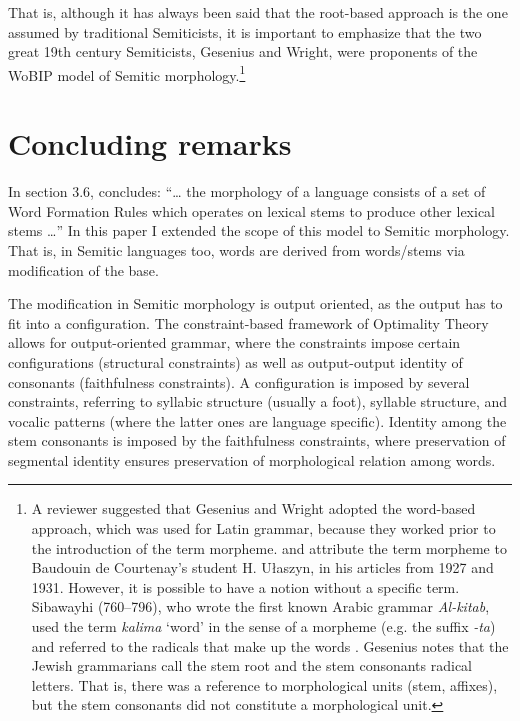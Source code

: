 \documentclass[output=paper,
modfonts
]{LSP/langsci}
\begin{document}
That is, although it has always been said that the root-based approach
is the one assumed by traditional Semiticists, it is important to
emphasize that the two great 19th century Semiticists,
Gesenius and Wright, were proponents of the WoBIP model of Semitic
morphology.\footnote{A reviewer suggested that Gesenius and Wright
  adopted the word-based approach, which was used for Latin grammar,
  because they worked prior to the introduction of the term morpheme.
  \citet{kilbury1976a} and \citet{anderson1985a} attribute the term morpheme to
  Baudouin de Courtenay's student H. Ułaszyn, in his articles from 1927
  and 1931. However, it is possible to have a notion without a specific
  term. Sibawayhi (760--796), who wrote the first known Arabic grammar
  \emph{Al-kitab}, used the term \emph{kalima} `word' in the sense of a
  morpheme (e.g. the suffix \emph{-ta}) and referred to the radicals
  that make up the words \citep{levin1986}. Gesenius notes that the Jewish
  grammarians call the stem root and the stem consonants radical
  letters. That is, there was a reference to morphological units (stem,
  affixes), but the stem consonants did not constitute a morphological
  unit.}

\section{Concluding remarks}\label{concluding-remarks}

In section 3.6, \citet[71]{anderson1992} concludes: ``\ldots{} the morphology of
a language consists of a set of Word Formation Rules which operates on
lexical stems to produce other lexical stems \ldots{}'' In this
paper I extended the scope of this model to Semitic morphology. That is,
in Semitic languages too, words are derived from words/stems via
modification of the base.

The modification in Semitic morphology is output oriented, as the output
has to fit into a configuration. The constraint-based framework of
Optimality Theory \citep{prince1993a} allows for
output-oriented grammar, where the constraints impose certain
configurations (structural constraints) as well as output-output
identity of consonants (faithfulness constraints). A configuration is
imposed by several constraints, referring to syllabic structure (usually
a foot), syllable structure, and vocalic patterns (where the latter ones
are language specific). Identity among the stem consonants is imposed by
the faithfulness constraints, where preservation of segmental identity
ensures preservation of morphological relation among words.
\end{document}
